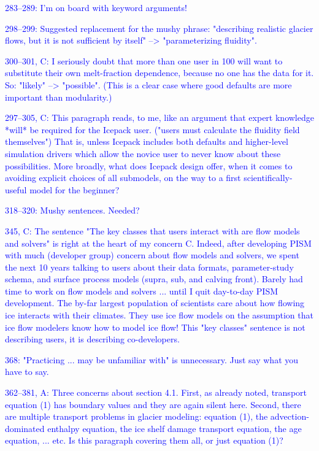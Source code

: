 \documentclass{article}
\theoremstyle{definition}
\theoremstyle{plain}
\begin{document}
\textcolor{blue}{283--289:  I'm on board with keyword arguments!}

\textcolor{blue}{298--299:  Suggested replacement for the mushy phrase: "describing realistic glacier flows, but it is not sufficient by itself" --> "parameterizing fluidity".}

\textcolor{blue}{300--301, C:  I seriously doubt that more than one user in 100 will want to substitute their own melt-fraction dependence, because no one has the data for it.  So: "likely" --> "possible".  (This is a clear case where good defaults are more important than modularity.)}

\textcolor{blue}{297--305, C:  This paragraph reads, to me, like an argument that expert knowledge *will* be required for the Icepack user.  ("users must calculate the fluidity field themselves")  That is, unless Icepack includes both defaults and higher-level simulation drivers which allow the novice user to never know about these possibilities.  More broadly, what does Icepack design offer, when it comes to avoiding explicit choices of all submodels, on the way to a first scientifically-useful model for the beginner?}

\textcolor{blue}{318--320:  Mushy sentences.  Needed?}

\textcolor{blue}{345, C:  The sentence "The key classes that users interact with are flow models and solvers" is right at the heart of my concern C.  Indeed, after developing PISM with much (developer group) concern about flow models and solvers, we spent the next 10 years talking to users about their data formats, parameter-study schema, and surface process models (supra, sub, and calving front).  Barely had time to work on flow models and solvers ... until I quit day-to-day PISM development.  The by-far largest population of scientists care about how flowing ice interacts with their climates.  They use ice flow models on the assumption that ice flow modelers know how to model ice flow!  This "key classes" sentence is not describing users, it is describing co-developers.}

\textcolor{blue}{368:  "Practicing ... may be unfamiliar with" is unnecessary.  Just say what you have to say.}

\textcolor{blue}{362--381, A:  Three concerns about section 4.1.  First, as already noted, transport equation (1) has boundary values and they are again silent here.  Second, there are multiple transport problems in glacier modeling: equation (1), the advection-dominated enthalpy equation, the ice shelf damage transport equation, the age equation, ... etc.  Is this paragraph covering them all, or just equation (1)?}
\end{document}
